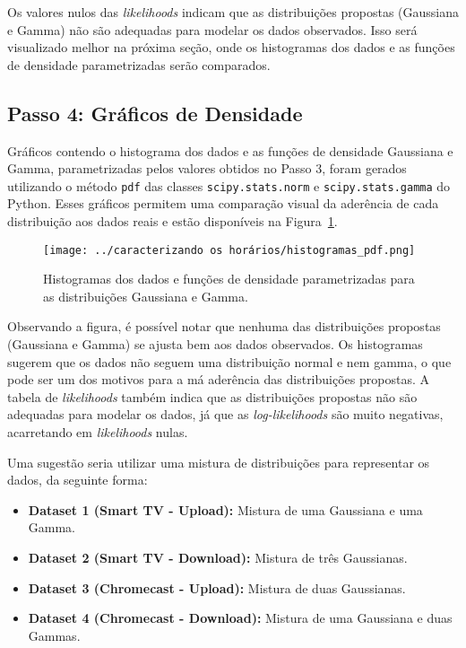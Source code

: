 Os valores nulos das \textit{likelihoods} indicam que as distribuições propostas (Gaussiana e Gamma) não são adequadas para modelar os dados observados. Isso será visualizado melhor na próxima seção, onde os histogramas dos dados e as funções de densidade parametrizadas serão comparados.

\subsection{Passo 4: Gráficos de Densidade}

Gráficos contendo o histograma dos dados e as funções de densidade Gaussiana e Gamma, parametrizadas pelos valores obtidos no Passo 3, foram gerados utilizando o método \texttt{pdf} das classes \texttt{scipy.stats.norm} e \texttt{scipy.stats.gamma} do Python. Esses gráficos permitem uma comparação visual da aderência de cada distribuição aos dados reais e estão disponíveis na Figura~\ref{fig:histogramas_pdf}.

\begin{figure}[H]
    \centering
    \texttt{[image: ../caracterizando os horários/histogramas\_pdf.png]}
    \caption{Histogramas dos dados e funções de densidade parametrizadas para as distribuições Gaussiana e Gamma.}
    \label{fig:histogramas_pdf}
\end{figure}

Observando a figura, é possível notar que nenhuma das distribuições propostas (Gaussiana e Gamma) se ajusta bem aos dados observados. Os histogramas sugerem que os dados não seguem uma distribuição normal e nem gamma, o que pode ser um dos motivos para a má aderência das distribuições propostas. A tabela de \textit{likelihoods} também indica que as distribuições propostas não são adequadas para modelar os dados, já que as \textit{log-likelihoods} são muito negativas, acarretando em \textit{likelihoods} nulas.

Uma sugestão seria utilizar uma mistura de distribuições para representar os dados, da seguinte forma:

\begin{itemize}
    \item \textbf{Dataset 1 (Smart TV - Upload):} Mistura de uma Gaussiana e uma Gamma.
    \item \textbf{Dataset 2 (Smart TV - Download):} Mistura de três Gaussianas.
    \item \textbf{Dataset 3 (Chromecast - Upload):} Mistura de duas Gaussianas.
    \item \textbf{Dataset 4 (Chromecast - Download):} Mistura de uma Gaussiana e duas Gammas.
\end{itemize}

